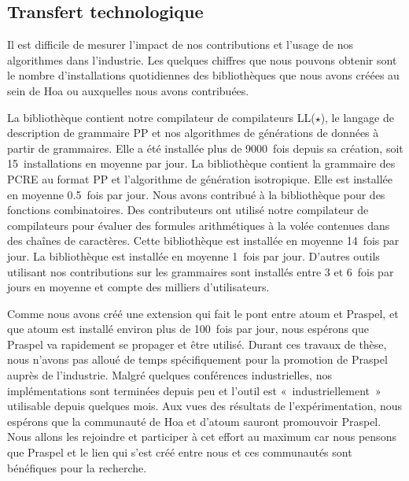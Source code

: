\subsection{Transfert technologique}

Il est difficile de mesurer l'impact de nos contributions et l'usage de nos
algorithmes dans l'industrie. Les quelques chiffres que nous pouvons obtenir
sont le nombre d'installations quotidiennes des bibliothèques que nous avons
créées au sein de Hoa ou auxquelles nous avons contribuées.

La bibliothèque  contient notre compilateur de
compilateurs LL($\star$), le langage de description de grammaire PP et nos
algorithmes de générations de données à partir de grammaires. Elle a été
installée plus de 9000~fois depuis sa création, soit 15~installations en moyenne
par jour. La bibliothèque  contient la grammaire des
PCRE au format PP et l'algorithme de génération isotropique. Elle est installée
en moyenne 0.5~fois par jour. Nous avons contribué à la bibliothèque
 pour des fonctions combinatoires. Des contributeurs ont
utilisé notre compilateur de compilateurs pour évaluer des formules
arithmétiques à la volée contenues dans des chaînes de caractères. Cette
bibliothèque est installée en moyenne 14~fois par jour. La bibliothèque
 est installée en moyenne 1~fois par jour.  D'autres
outils utilisant nos contributions sur les grammaires sont installés entre 3 et
6~fois par jours en moyenne et compte des milliers d'utilisateurs. 

Comme nous avons créé une extension qui fait le pont entre atoum et Praspel, et
que atoum est installé environ plus de 100~fois par jour, nous espérons que
Praspel va rapidement se propager et être utilisé. Durant ces travaux de thèse,
nous n'avons pas alloué de temps spécifiquement pour la promotion de Praspel
auprès de l'industrie. Malgré quelques conférences industrielles, nos
implémentations sont terminées depuis peu et l'outil est «~industriellement~»
utilisable depuis quelques mois. Aux vues des résultats de l'expérimentation,
nous espérons que la communauté de Hoa et d'atoum sauront promouvoir Praspel.
Nous allons les rejoindre et participer à cet effort au maximum car nous pensons
que Praspel et le lien qui s'est créé entre nous et ces communautés sont
bénéfiques pour la recherche.
